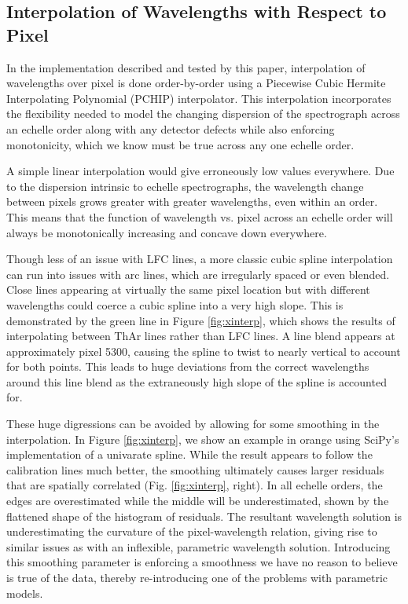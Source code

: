 \documentclass[twocolumn,table,xcolor,trackchanges]{aastex63}
\begin{document}
\subsection{Interpolation of Wavelengths with Respect to Pixel}
\label{sec:choice_wvp}
In the implementation described and tested by this paper, interpolation of wavelengths over pixel  is done order-by-order using a Piecewise Cubic Hermite Interpolating Polynomial (PCHIP) interpolator.  This interpolation incorporates the flexibility needed to model the changing dispersion of the spectrograph across an echelle order along with any detector defects while also enforcing monotonicity, which we know must be true across any one echelle order.

A simple linear interpolation would give erroneously low values everywhere.  Due to the dispersion intrinsic to echelle spectrographs, the wavelength change between pixels grows greater with greater wavelengths, even within an order.  This means that the function of wavelength vs. pixel across an echelle order will always be monotonically increasing and concave down everywhere.

Though less of an issue with LFC lines, a more classic cubic spline interpolation can run into issues with arc lines, which are irregularly spaced or even blended.  Close lines appearing at virtually the same pixel location but with different wavelengths could coerce a cubic spline into a very high slope.  This is demonstrated by the green line in Figure \ref{fig:xinterp}, which shows the results of interpolating between ThAr lines rather than LFC lines.  A line blend appears at approximately pixel 5300, causing the spline to twist to nearly vertical to account for both points.  This leads to huge deviations from the correct wavelengths around this line blend as the extraneously high slope of the spline is accounted for.

These huge digressions can be avoided by allowing for some smoothing in the interpolation.  In Figure \ref{fig:xinterp}, we show an example in orange using SciPy's implementation of a univarate spline.  While the result appears to follow the calibration lines much better, the smoothing ultimately causes larger residuals that are spatially correlated (Fig. \ref{fig:xinterp}, right).  In all echelle orders, the edges are overestimated while the middle will be underestimated, shown by the flattened shape of the histogram of residuals.  The resultant wavelength solution is underestimating the curvature of the pixel-wavelength relation, giving rise to similar issues as with an inflexible, parametric wavelength solution.  Introducing this smoothing parameter is enforcing a smoothness we have no reason to believe is true of the data, thereby re-introducing one of the problems with parametric models.
\end{document}
